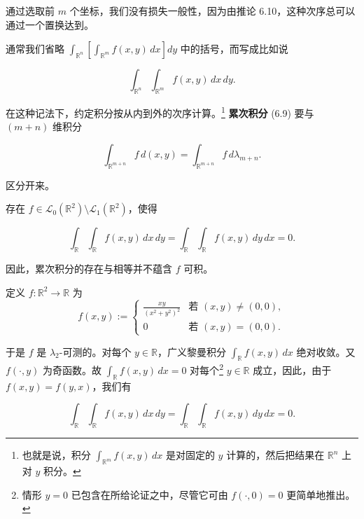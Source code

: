 \begin{remark}

\begin{items}
\item

通过选取前 $ m $ 个坐标，我们没有损失一般性，因为由推论 6.10，这种次序总可以通过一个置换达到。

\item

通常我们省略 $ \int_{\mathbb{R}^n}\left[\int_{\mathbb{R}^m} f(x,y)\,dx\right]dy $ 中的括号，而写成比如说

\begin{equation}
\int_{\mathbb{R}^n}\int_{\mathbb{R}^m} f(x,y)\,dx\,dy .\tag{6.9}
\end{equation}

在这种记法下，约定积分按从内到外的次序计算。\footnote{也就是说，积分 $ \int_{\mathbb{R}^m} f(x,y)\,dx $ 是对固定的 $ y $ 计算的，然后把结果在 $ \mathbb{R}^n $ 上对 $ y $ 积分。} \textbf{累次积分} (6.9) 要与 $ (m+n) $ 维积分

\[
\int_{\mathbb{R}^{m+n}} f\,d(x,y) = \int_{\mathbb{R}^{m+n}} f\,d\lambda_{m+n} .
\]

区分开来。

\item

存在 $ f \in \mathcal{L}_0(\mathbb{R}^2)\setminus\mathcal{L}_1(\mathbb{R}^2) $，使得

\[
\int_{\mathbb{R}}\int_{\mathbb{R}} f(x,y)\,dx\,dy = \int_{\mathbb{R}}\int_{\mathbb{R}} f(x,y)\,dy\,dx = 0 .
\]

因此，累次积分的存在与相等并不蕴含 $ f $ 可积。

\proofhead
定义 $ f : \mathbb{R}^2 \to \mathbb{R} $ 为
\begin{equation}
f(x,y) := \begin{cases} \frac{xy}{(x^2+y^2)^2} & \text{若 } (x,y) \ne (0,0) , \\ 0 & \text{若 } (x,y) = (0,0) . \end{cases}\tag{6.10}
\end{equation}

于是 $ f $ 是 $ \lambda_2 $-可测的。对每个 $ y \in \mathbb{R} $，广义黎曼积分 $ \int_{\mathbb{R}} f(x,y)\,dx $ 绝对收敛。又 $ f(\cdot,y) $ 为奇函数。故 $ \int_{\mathbb{R}} f(x,y)\,dx = 0 $ 对每个\footnote{情形 $ y = 0 $ 已包含在所给论证之中，尽管它可由 $ f(\cdot,0) = 0 $ 更简单地推出。} $ y \in \mathbb{R} $ 成立，因此，由于 $ f(x,y) = f(y,x) $，我们有

\[
\int_{\mathbb{R}}\int_{\mathbb{R}} f(x,y)\,dx\,dy = \int_{\mathbb{R}}\int_{\mathbb{R}} f(x,y)\,dy\,dx = 0 .
\]


\end{items}
\end{remark}

